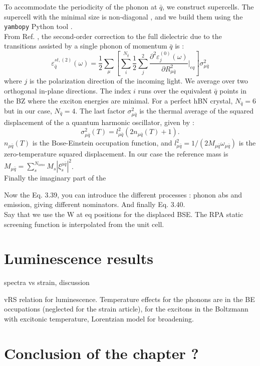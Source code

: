 To accommodate the periodicity of the phonon at $\bar{q}$, we construct supercells. The supercell with the minimal size is non-diagonal \cite{lloyd2015lattice}, and we build them using the \texttt{yambopy} Python tool \cite{Sangalli_2019}. \\
From Ref. \cite{zacharias2020theory}, the second-order correction to the full dielectric due to the transitions assisted by a single phonon of momentum $\bar{q}$ is :
\begin{equation}
	\varepsilon^{st,(2)}_{\bar{q}} (\omega) = \frac{1}{2} \sum_\mu \left[ \sum_i^{N_{\bar{q}}} \frac{1}{2} \sum_j^2 \frac{\partial^2 \varepsilon^{(0)}_j(\omega)}{\partial R^2_{\mu\bar{q}}} \biggr|_{eq} \right] \sigma^2_{\mu\bar{q}}
\end{equation}
where $j$ is the polarization direction of the incoming light. We average over two orthogonal in-plane directions. The index $i$ runs over the equivalent $\bar{q}$ points in the \acrshort{BZ} where the exciton energies are minimal. For a perfect hBN crystal, $N_{\bar{q}} = 6$ but in our case, $N_{\bar{q}} = 4$. The last factor $\sigma^2_{\mu\bar{q}}$ is the thermal average of the squared displacement of the a quantum harmonic oscillator, given by :
\begin{equation}
	\sigma^2_{\mu\bar{q}}(T) = l^2_{\mu\bar{q}} (2n_{\mu\bar{q}}(T) + 1).
\end{equation}
$n_{\mu\bar{q}}(T)$ is the Bose-Einstein occupation function, and $l^2_{\mu\bar{q}} = 1/(2M_{\mu\bar{q}}\omega_{\mu\bar{q}})$ is the zero-temperature squared displacement. In our case the reference mass is $M_{\mu\bar{q}} = \sum^{N_{ions}}_s M_s |\xi_s^{\mu\bar{q}}|^2$.\\
Finally the imaginary part of the 

Now the Eq. 3.39, you can introduce the different processes : phonon abs and emission, giving different nominators. And finally Eq. 3.40. \\







Say that we use the W at eq positions for the displaced BSE. The \acrshort{RPA} static screening function is  interpolated from the unit cell. \\


%
\section{Luminescence results}
spectra vs strain, discussion


vRS relation for luminescence. Temperature effects for the phonons are in the BE occupations (neglected for the strain article), for the excitons in the Boltzmann with excitonic temperature, Lorentzian model for broadening.


%
\section*{Conclusion of the chapter ?}